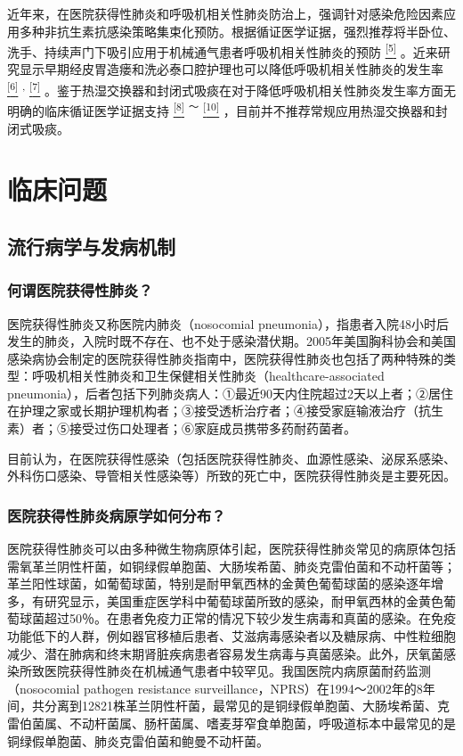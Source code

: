 近年来，在医院获得性肺炎和呼吸机相关性肺炎防治上，强调针对感染危险因素应用多种非抗生素抗感染策略集束化预防。根据循证医学证据，强烈推荐将半卧位、洗手、持续声门下吸引应用于机械通气患者呼吸机相关性肺炎的预防
\protect\hyperlink{text00014.htmlux5cux23ch5-13}{\textsuperscript{{[}5{]}}}
。近来研究显示早期经皮胃造瘘和洗必泰口腔护理也可以降低呼吸机相关性肺炎的发生率
\protect\hyperlink{text00014.htmlux5cux23ch6-13}{\textsuperscript{{[}6{]}}}
\textsuperscript{,}
\protect\hyperlink{text00014.htmlux5cux23ch7-13}{\textsuperscript{{[}7{]}}}
。鉴于热湿交换器和封闭式吸痰在对于降低呼吸机相关性肺炎发生率方面无明确的临床循证医学证据支持
\protect\hyperlink{text00014.htmlux5cux23ch8-13}{\textsuperscript{{[}8{]}}}
\textsuperscript{～}
\protect\hyperlink{text00014.htmlux5cux23ch10-13}{\textsuperscript{{[}10{]}}}
，目前并不推荐常规应用热湿交换器和封闭式吸痰。

\section{临床问题}

\subsection{流行病学与发病机制}

\subsubsection{何谓医院获得性肺炎？}

医院获得性肺炎又称医院内肺炎（nosocomial
pneumonia），指患者入院48小时后发生的肺炎，入院时既不存在、也不处于感染潜伏期。2005年美国胸科协会和美国感染病协会制定的医院获得性肺炎指南中，医院获得性肺炎也包括了两种特殊的类型：呼吸机相关性肺炎和卫生保健相关性肺炎（healthcare-associated
pneumonia），后者包括下列肺炎病人：①最近90天内住院超过2天以上者；②居住在护理之家或长期护理机构者；③接受透析治疗者；④接受家庭输液治疗（抗生素）者；⑤接受过伤口处理者；⑥家庭成员携带多药耐药菌者。

目前认为，在医院获得性感染（包括医院获得性肺炎、血源性感染、泌尿系感染、外科伤口感染、导管相关性感染等）所致的死亡中，医院获得性肺炎是主要死因。

\subsubsection{医院获得性肺炎病原学如何分布？}

医院获得性肺炎可以由多种微生物病原体引起，医院获得性肺炎常见的病原体包括需氧革兰阴性杆菌，如铜绿假单胞菌、大肠埃希菌、肺炎克雷伯菌和不动杆菌等；革兰阳性球菌，如葡萄球菌，特别是耐甲氧西林的金黄色葡萄球菌的感染逐年增多，有研究显示，美国重症医学科中葡萄球菌所致的感染，耐甲氧西林的金黄色葡萄球菌超过50％。在患者免疫力正常的情况下较少发生病毒和真菌的感染。在免疫功能低下的人群，例如器官移植后患者、艾滋病毒感染者以及糖尿病、中性粒细胞减少、潜在肺病和终末期肾脏疾病患者容易发生病毒与真菌感染。此外，厌氧菌感染所致医院获得性肺炎在机械通气患者中较罕见。我国医院内病原菌耐药监测（nosocomial
pathogen resistance
surveillance，NPRS）在1994～2002年的8年间，共分离到12821株革兰阴性杆菌，最常见的是铜绿假单胞菌、大肠埃希菌、克雷伯菌属、不动杆菌属、肠杆菌属、嗜麦芽窄食单胞菌，呼吸道标本中最常见的是铜绿假单胞菌、肺炎克雷伯菌和鲍曼不动杆菌。

